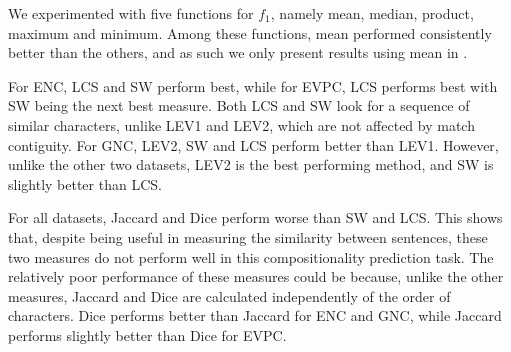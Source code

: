 \documentclass[output=paper,modfonts,nonflat]{langsci/langscibook}
\begin{document}
We experimented with five functions for $f_1$, namely mean, median,
product, maximum and minimum. Among these functions, mean performed
consistently better than the others, and as such we only present results
using mean in .



For ENC, LCS and SW perform best, while for EVPC, LCS performs best
with SW being the next best measure. Both LCS and
SW look for a sequence of similar characters, unlike LEV1 and LEV2, 
which are not affected by match contiguity. For GNC, LEV2, SW and LCS
perform better than LEV1. However, unlike the other two datasets, LEV2
is the best performing method, and SW is slightly better than LCS.

For all datasets, Jaccard and Dice perform worse than SW and LCS. This
shows that, despite being useful in measuring the similarity between
sentences, these two measures do not perform well in this
compositionality prediction task. The relatively poor performance of
these measures could be because, unlike the other measures, Jaccard and
Dice are calculated independently of the order of characters. Dice
performs better than Jaccard for ENC and GNC, while Jaccard performs
slightly better than Dice for EVPC. 
\end{document}
